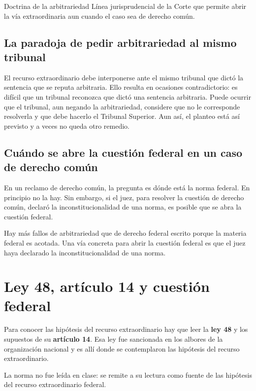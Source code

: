 \documentclass[12pt,oneside]{book}
\begin{document}
\begin{definition}{Doctrina de la arbitrariedad}
Línea jurisprudencial de la Corte que permite abrir la vía extraordinaria aun cuando el caso sea de derecho común.
\end{definition}

\subsection{La paradoja de pedir arbitrariedad al mismo tribunal}

El recurso extraordinario debe interponerse ante el mismo tribunal que dictó la sentencia que se reputa arbitraria. Ello resulta en ocasiones contradictorio: es difícil que un tribunal reconozca que dictó una sentencia arbitraria. Puede ocurrir que el tribunal, aun negando la arbitrariedad, considere que no le corresponde resolverla y que debe hacerlo el Tribunal Superior. Aun así, el planteo está así previsto y a veces no queda otro remedio.

\subsection{Cuándo se abre la cuestión federal en un caso de derecho común}

En un reclamo de derecho común, la pregunta es dónde está la norma federal. En principio no la hay. Sin embargo, si el juez, para resolver la cuestión de derecho común, declaró la inconstitucionalidad de una norma, es posible que se abra la cuestión federal.

\begin{important}
Hay más fallos de arbitrariedad que de derecho federal escrito porque la materia federal es acotada. Una vía concreta para abrir la cuestión federal es que el juez haya declarado la inconstitucionalidad de una norma.
\end{important}

\section{Ley 48, artículo 14 y cuestión federal}

Para conocer las hipótesis del recurso extraordinario hay que leer la \textbf{ley 48} y los supuestos de su \textbf{artículo 14}. Esa ley fue sancionada en los albores de la organización nacional y es allí donde se contemplaron las hipótesis del recurso extraordinario.

\begin{note}
La norma no fue leída en clase: se remite a su lectura como fuente de las hipótesis del recurso extraordinario federal.
\end{note}
\end{document}
